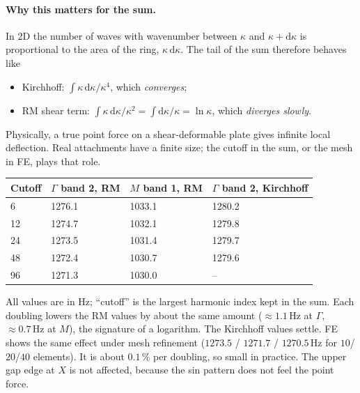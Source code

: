 \paragraph{Why this matters for the sum.}
In 2D the number of waves with wavenumber between $\kappa$ and $\kappa +
\mathrm{d}\kappa$ is proportional to the area of the ring, $\kappa\,\mathrm{d}\kappa$.
The tail of the sum therefore behaves like
\begin{itemize}
  \item Kirchhoff: $\int \kappa\,\mathrm{d}\kappa/\kappa^4$, which \emph{converges};
  \item RM shear term: $\int \kappa\,\mathrm{d}\kappa/\kappa^2 = \int \mathrm{d}\kappa/\kappa = \ln\kappa$,
        which \emph{diverges slowly}.
\end{itemize}
Physically, a true point force on a shear-deformable plate gives infinite local
deflection. Real attachments have a finite size; the cutoff in the sum, or the
mesh in FE, plays that role.
\begin{center}
\begin{tabular}{|l|l|l|l|}
\hline
Cutoff & $\Gamma$ band 2, RM & $M$ band 1, RM & $\Gamma$ band 2, Kirchhoff \\
\hline
6 & 1276.1 & 1033.1 & 1280.2 \\
12 & 1274.7 & 1032.1 & 1279.8 \\
24 & 1273.5 & 1031.4 & 1279.7 \\
48 & 1272.4 & 1030.7 & 1279.6 \\
96 & 1271.3 & 1030.0 & -- \\
\hline
\end{tabular}
\end{center}
All values are in Hz; ``cutoff'' is the largest harmonic index kept in the sum.
Each doubling lowers the RM values by about the same amount
($\approx 1.1\,\mathrm{Hz}$ at $\Gamma$, $\approx 0.7\,\mathrm{Hz}$ at $M$), the
signature of a logarithm. The Kirchhoff values settle. FE shows the same effect
under mesh refinement ($1273.5$ / $1271.7$ / $1270.5\,\mathrm{Hz}$ for $10$/$20$/$40$
elements). It is about $0.1\,\%$ per doubling, so small in practice. The upper
gap edge at $X$ is not affected, because the sin pattern does not feel the point
force.

